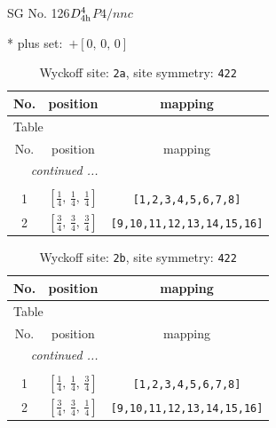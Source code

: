 \documentclass[fleqn,8pt]{jsarticle}
\begin{document}
\setcounter{MaxMatrixCols}{32}

\renewcommand{\tablename}{Table~}
\renewcommand{\figurename}{Figure~}
\begin{center}
\LARGE
SG No. 126\quad$D_{\rm 4h}^{4}$\quad$P4/nnc$\quad[ tetragonal ]
\end{center}
* plus set:\,\,\,$+\left[ 0,\, 0,\, 0 \right]$
\renewcommand{\arraystretch}{1.2}
\begin{longtable}{ccc}
\caption{Wyckoff site: {\tt 2a}, site symmetry: {\tt 422}}
 \\
 \hline \hline
No. & position & mapping \\ \hline \endfirsthead

\multicolumn{2}{l}{\tablename\ \thetable{}} \\
 \hline \hline
No. & position & mapping \\ \hline \endhead

 \hline \hline
\multicolumn{2}{r}{\footnotesize\it continued ...} \\ \endfoot

 \hline \hline
\multicolumn{2}{r}{} \\ \endlastfoot

1 & $\left[ \frac{1}{4},\, \frac{1}{4},\, \frac{1}{4} \right]$ & {\tt [1,2,3,4,5,6,7,8]} \\ \hline
2 & $\left[ \frac{3}{4},\, \frac{3}{4},\, \frac{3}{4} \right]$ & {\tt [9,10,11,12,13,14,15,16]} \\
\end{longtable}
\renewcommand{\arraystretch}{1.2}
\begin{longtable}{ccc}
\caption{Wyckoff site: {\tt 2b}, site symmetry: {\tt 422}}
 \\
 \hline \hline
No. & position & mapping \\ \hline \endfirsthead

\multicolumn{2}{l}{\tablename\ \thetable{}} \\
 \hline \hline
No. & position & mapping \\ \hline \endhead

 \hline \hline
\multicolumn{2}{r}{\footnotesize\it continued ...} \\ \endfoot

 \hline \hline
\multicolumn{2}{r}{} \\ \endlastfoot

1 & $\left[ \frac{1}{4},\, \frac{1}{4},\, \frac{3}{4} \right]$ & {\tt [1,2,3,4,5,6,7,8]} \\ \hline
2 & $\left[ \frac{3}{4},\, \frac{3}{4},\, \frac{1}{4} \right]$ & {\tt [9,10,11,12,13,14,15,16]} \\
\end{longtable}
\end{document}
